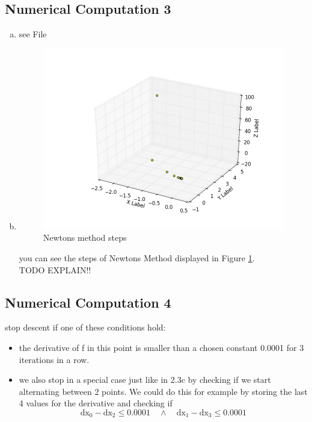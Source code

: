 \documentclass[12pt]{article}
\begin{document}
\subsection{Numerical Computation 3}
\begin{enumerate}[a)]
    \item 
        see File
    \item
        \begin{figure}[H]
            \centering
            \includegraphics[width=300pt]{pictures/figure_7.png}
            \caption{Newtons method steps}
            \label{fig:fig7}
        \end{figure}
        you can see the steps of Newtons Method displayed in Figure \ref{fig:fig7}.\\
        TODO EXPLAIN!!

\end{enumerate}


\subsection{Numerical Computation 4}
stop descent if one of these conditions hold:
\begin{itemize}
    \item 
        the derivative of f in this point is smaller than a chosen constant 0.0001 for 3 iterations in a row.
    \item
        we also stop in a special case just like in 2.3c by checking if we start alternating between 2 points. We could do this for example by storing the last 4 values for the derivative and checking if 
        $$ \text{dx}_0 - \text{dx}_2 \leq 0.0001 \quad \land \quad \text{dx}_1 - \text{dx}_3 \leq 0.0001 $$
\end{itemize}
\end{document}
